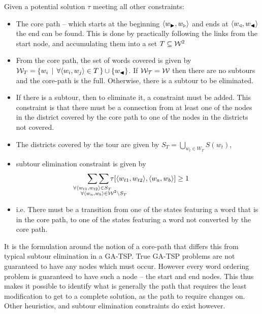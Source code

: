 \documentclass[twocolumn]{article}
\begin{document}
Given a potential solution $\tau$ meeting all other constraints:
\begin{itemize}
\item The core path -- which starts at the beginning $\langle w_{\blacktriangleright},w_{\triangleright}\rangle$
and ends at $\langle w_{\triangleleft},w_{\blacktriangleleft}\rangle$the end can be found. This is done
by practically following the links from the start node, and accumulating
them into a set $T\subseteq\mathcal{W}^{2}$
\item From the core path, the set of words covered is given by $\mathcal{W}_{T}=\{w_{i}\,\mid\,\forall\langle w_{i},w_{j}\rangle\in T\,\}\cup\{w_{\blacktriangleleft}\}$.
If $\mathcal{W_{T}}=\mathcal{W}$ then there are no subtours and the core-path
is the full. Otherwise, there is a subtour to be eliminated.
\item If there is a subtour, then to eliminate it, a constraint must be
added. This constraint is that there must be a connection from at
least one of the nodes in the district covered by the core path to
one of the nodes in the districts not covered.
\item The districts covered by the tour are given by $S_{T}=\bigcup_{w_{t}\in W_{T}}S(w_{t})$,
\item subtour elimination constraint is given by 
\begin{equation*}
  \sum_{\mathclap{\forall\langle w_{t1},w_{t2}\rangle\in S_{T}}}
  \sum_{\mathclap{\substack{\; \\ \;\\ \forall\langle w_{a},w_{b}\rangle\in\W^{2}\backslash S_{T}}}}
  \tau[\langle w_{t1},w_{t2}\rangle,\langle w_{a},w_{b}\rangle]\ge1
\end{equation*}
\item i.e. There must be a transition from one of the states featuring a
word that is in the core path, to one of the states featuring a word
not converted by the core path.

\end{itemize}
It is the formulation around the notion of a core-path that differs this from typical subtour elimination in a GA-TSP. True GA-TSP problems are not guaranteed to have any nodes which must occur. However every word ordering problem is guaranteed to have such a node -- the start and end nodes. This thus makes it possible to identify what is generally the path that requires the least modification to get to a complete solution, as the path to require changes on. Other heuristics, and subtour elimination constraints do exist however.
\end{document}
